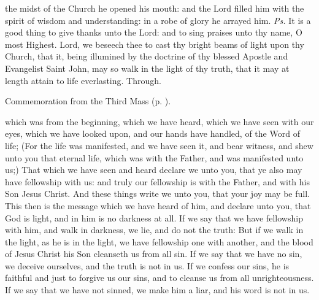 
\introit
{} the midst of the Church he opened his mouth: and the Lord filled him with the spirit of wisdom and understanding: in a robe of glory he arrayed him. \textit{Ps.} It is a good thing to give thanks unto the Lord: and to sing praises unto thy name, O most Highest.
\collect
{} Lord, we beseech thee to cast thy bright beams of light upon thy Church, that it, being illumined by the doctrine of thy blessed Apostle and Evangelist Saint John, may so walk in the light of thy truth, that it may at length attain to life everlasting. Through.
\begin{rubric}
    Commemoration  from the Third Mass (p. \pageref{NativityMassIIICollect}).
\end{rubric}
 which was from the beginning, which we have heard, which we have seen with our eyes, which we have looked upon, and our hands have handled, of the Word of life; (For the life was manifested, and we have seen it, and bear witness, and shew unto you that eternal life, which was with the Father, and was manifested unto us;) That which we have seen and heard declare we unto you, that ye also may have fellowship with us: and truly our fellowship is with the Father, and with his Son Jesus Christ. And these things write we unto you, that your joy may be full. This then is the message which we have heard of him, and declare unto you, that God is light, and in him is no darkness at all. If we say that we have fellowship with him, and walk in darkness, we lie, and do not the truth: But if we walk in the light, as he is in the light, we have fellowship one with another, and the blood of Jesus Christ his Son cleanseth us from all sin. If we say that we have no sin, we deceive ourselves, and the truth is not in us. If we confess our sins, he is faithful and just to forgive us our sins, and to cleanse us from all unrighteousness. If we say that we have not sinned, we make him a liar, and his word is not in us.


